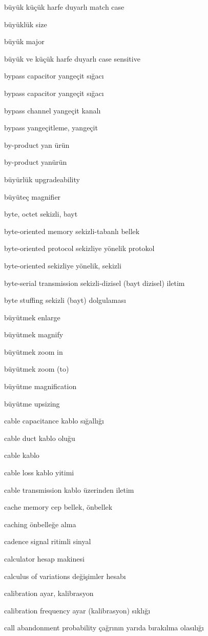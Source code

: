 \documentclass[12pt,fleqn]{article}\usepackage{../../common}
\begin{document}
büyük küçük harfe duyarlı match case

büyüklük size

büyük major

büyük ve küçük harfe duyarlı case sensitive

bypass capacitor yangeçit sığacı

bypass capacitor yangeçit sığacı

bypass channel yangeçit kanalı

bypass yangeçitleme, yangeçit

by-product yan ürün

by-product yanürün

büyürlük upgradeability

büyüteç magnifier

byte, octet sekizli, bayt

byte-oriented memory sekizli-tabanlı bellek

byte-oriented protocol sekizliye yönelik protokol

byte-oriented sekizliye yönelik, sekizli

byte-serial transmission sekizli-dizisel (bayt dizisel) iletim

byte stuffing sekizli (bayt) dolgulaması

büyütmek enlarge

büyütmek magnify

büyütmek zoom in

büyütmek zoom (to)

büyütme magnification

büyütme upsizing

cable capacitance kablo sığallığı

cable duct kablo oluğu

cable kablo

cable loss kablo yitimi

cable transmission kablo üzerinden iletim

cache memory cep bellek, önbellek

caching önbelleğe alma

cadence signal ritimli sinyal

calculator hesap makinesi

calculus of variations değişimler hesabı

calibration ayar, kalibrasyon

calibration frequency ayar (kalibrasyon) sıklığı

call abandonment probability çağrının yarıda bırakılma olasılığı
\end{document}
